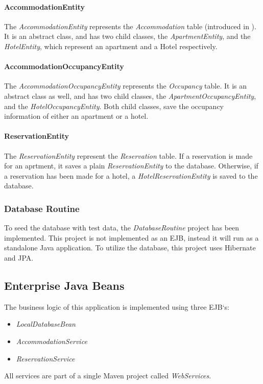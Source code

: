 \paragraph{AccommodationEntity}
The \textit{AccommodationEntity} represents the \textit{Accommodation} table (introduced in ). It is an abstract class, and has two child classes, the \textit{ApartmentEntity}, and the \textit{HotelEntity}, which represent an apartment and a Hotel respectively.

\paragraph{AccommodationOccupancyEntity}
The \textit{AccommodationOccupancyEntity} represents the \textit{Occupancy} table. It is an abstract class as well, and has two child classes, the \textit{ApartmentOccupancyEntity}, and the \textit{HotelOccupancyEntity}. Both child classes, save the occupancy information of either an apartment or a hotel.


\paragraph{ReservationEntity}
The \textit{ReservationEntity} represent the \textit{Reservation} table. If a reservation is made for an aprtment, it saves a plain \textit{ReservationEntity} to the database. Otherwise, if a reservation has been made for a hotel, a \textit{HotelReservationEntity} is saved to the database.

\subsubsection{Database Routine}\label{sec:02_design_db_routine}
To seed the database with test data, the \textit{DatabaseRoutine} project has been implemented.
This project is not implemented as an EJB, instead it will run as a standalone Java application.
To utilize the database, this project uses Hibernate and JPA.


\newpage
\subsection{Enterprise Java Beans}\label{sec:02_design_beans}
The business logic of this application is implemented using three EJB`s:
\begin{itemize}
\item \textit{LocalDatabaseBean}
\item \textit{AccommodationService}
\item \textit{ReservationService}
\end{itemize}
All services are part of a single Maven project called \textit{WebServices}.

